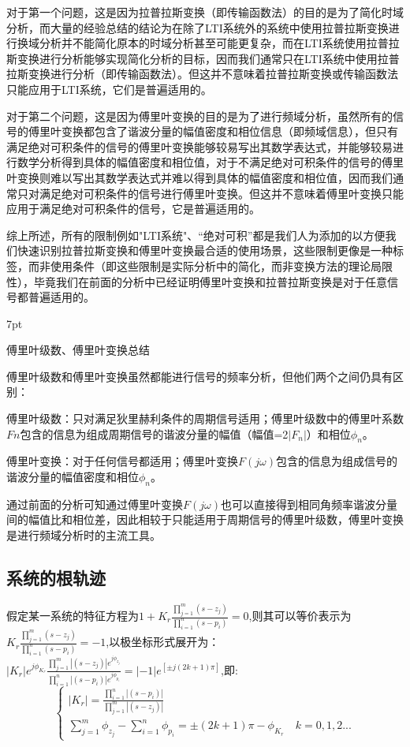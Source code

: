 \documentclass{article}
\numberwithin{equation}{section}
\numberwithin{figure}{section}
\newenvironment{formal}{%
\def\FrameCommand{%
\hspace{1pt}%
{\color{DarkBlue}\vrule width 2pt}%
{\color{formalshade}\vrule width 4pt}%
\colorbox{formalshade}%
}%
\MakeFramed{\advance\hsize-\width\FrameRestore}%
\noindent\hspace{-4.55pt}%
\begin{adjustwidth}{}{7pt}%
\vspace{2pt}\vspace{2pt}%
}
{%
\vspace{2pt}\end{adjustwidth}\endMakeFramed%
}
\begin{document}
    对于第一个问题，这是因为拉普拉斯变换（即传输函数法）的目的是为了简化时域分析，而大量的经验总结的结论为在除了LTI系统外的系统中使用拉普拉斯变换进行换域分析并不能简化原本的时域分析甚至可能更复杂，而在LTI系统使用拉普拉斯变换进行分析能够实现简化分析的目标，因而我们通常只在LTI系统中使用拉普拉斯变换进行分析（即传输函数法）。但这并不意味着拉普拉斯变换或传输函数法只能应用于LTI系统，它们是普遍适用的。

    对于第二个问题，这是因为傅里叶变换的目的是为了进行频域分析，虽然所有的信号的傅里叶变换都包含了谐波分量的幅值密度和相位信息（即频域信息），但只有满足绝对可积条件的信号的傅里叶变换能够较易写出其数学表达式，并能够较易进行数学分析得到具体的幅值密度和相位值，对于不满足绝对可积条件的信号的傅里叶变换则难以写出其数学表达式并难以得到具体的幅值密度和相位值，因而我们通常只对满足绝对可积条件的信号进行傅里叶变换。但这并不意味着傅里叶变换只能应用于满足绝对可积条件的信号，它是普遍适用的。

    综上所述，所有的限制例如"LTI系统"、“绝对可积”都是我们人为添加的以方便我们快速识别拉普拉斯变换和傅里叶变换最合适的使用场景，这些限制更像是一种标签，而非使用条件（即这些限制是实际分析中的简化，而非变换方法的理论局限性），毕竟我们在前面的分析中已经证明傅里叶变换和拉普拉斯变换是对于任意信号都普遍适用的。

\begin{formal}
    傅里叶级数、傅里叶变换总结
\end{formal}

    傅里叶级数和傅里叶变换虽然都能进行信号的频率分析，但他们两个之间仍具有区别：

    傅里叶级数：只对满足狄里赫利条件的周期信号适用；傅里叶级数中的傅里叶系数$Fn$包含的信息为组成周期信号的谐波分量的幅值（幅值=2$|F_n|$）和相位$\phi_n$。

    傅里叶变换：对于任何信号都适用；傅里叶变换$F(j\omega)$包含的信息为组成信号的谐波分量的幅值密度和相位$\phi_n$。

    通过前面的分析可知通过傅里叶变换$F(j\omega)$也可以直接得到相同角频率谐波分量间的幅值比和相位差，因此相较于只能适用于周期信号的傅里叶级数，傅里叶变换是进行频域分析时的主流工具。

\subsection{系统的根轨迹}

假定某一系统的特征方程为$1+K_r\frac{\prod_{j=1}^{m}(s-z_j)}{\prod_{i=1}^{n}(s-p_i)}=0$,则其可以等价表示为$K_r\frac{\prod_{j=1}^{m}(s-z_j)}{\prod_{i=1}^{n}(s-p_i)}=-1$,以极坐标形式展开为：$|K_r|e^{j\phi_{K_r}}\frac{\prod_{j=1}^{m}|(s-z_j)|e^{j\phi_{z_j}}}{\prod_{i=1}^{n}|(s-p_i)|e^{j\phi_{p_i}}}=|-1|e^{[±j(2k+1)\pi]}$,即:
\begin{equation}
    \begin{cases}
       |K_r|=\frac{\prod_{i=1}^{n}|(s-p_i)|}{\prod_{j=1}^{m}|(s-z_j)|}\\
       \sum_{j=1}^{m}\phi_{z_j}-\sum_{i=1}^{n}\phi_{p_i}=±(2k+1)\pi - \phi_{K_r} \quad k=0,1,2...
    \end{cases}
\end{equation}
\end{document}
